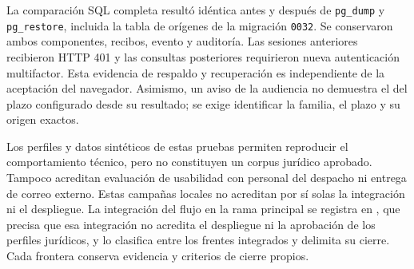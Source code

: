 La comparación SQL completa resultó idéntica antes y después de \texttt{pg\_dump} y \texttt{pg\_restore}, incluida la tabla de orígenes de la migración \texttt{0032}. Se conservaron ambos componentes, recibos, evento y auditoría. Las sesiones anteriores recibieron HTTP 401 y las consultas posteriores requirieron nueva autenticación multifactor. Esta evidencia de respaldo y recuperación es independiente de la aceptación del navegador. Asimismo, un aviso de la audiencia no demuestra el del plazo configurado desde su resultado; se exige identificar la familia, el plazo y su origen exactos.

Los perfiles y datos sintéticos de estas pruebas permiten reproducir el comportamiento técnico, pero no constituyen un corpus jurídico aprobado. Tampoco acreditan evaluación de usabilidad con personal del despacho ni entrega de correo externo. Estas campañas locales no acreditan por sí solas la integración ni el despliegue. La integración del flujo en la rama principal se registra en , que precisa que esa integración no acredita el despliegue ni la aprobación de los perfiles jurídicos, y  lo clasifica entre los frentes integrados y delimita su cierre. Cada frontera conserva evidencia y criterios de cierre propios.
